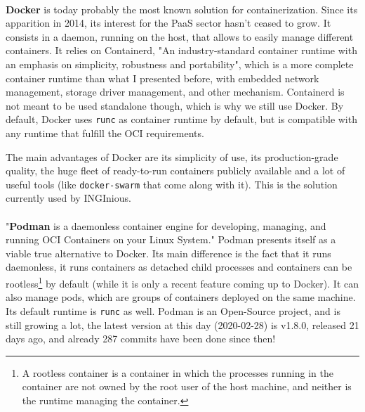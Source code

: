 \paragraph{}\textbf{Docker}\cite{merkel2014docker} is today probably the most known solution for containerization.  Since its apparition in 2014, its interest for the PaaS sector hasn't ceased to grow.  It consists in a daemon, running on the host, that allows to easily manage different containers.  It relies on Containerd, "An industry-standard container runtime with an emphasis on simplicity, robustness and portability"\cite{containerd}, which is a more complete container runtime than what I presented before, with embedded network management, storage driver management, and other mechanism.  Containerd is not meant to be used standalone though, which is why we still use Docker.  By default, Docker uses \texttt{runc} as container runtime by default, but is compatible with any runtime that fulfill the OCI\cite{oci} requirements.

The main advantages of Docker are its simplicity of use, its production-grade quality, the huge fleet of ready-to-run containers publicly available and a lot of useful tools (like \texttt{docker-swarm} that come along with it).  This is the solution currently used by INGInious.

\paragraph{}"\textbf{Podman} is a daemonless container engine for developing, managing, and running OCI\cite{oci} Containers on your Linux System."\cite{podman}  Podman presents itself as a viable true alternative to Docker.  Its main difference is the fact that it runs daemonless, it runs containers as detached child processes and containers can be rootless\footnote{A rootless container is a container in which the processes running in the container are not owned by the root user of the host machine, and neither is the runtime managing the container.} by default (while it is only a recent feature coming up to Docker).  It can also manage pods, which are groups of containers deployed on the same machine. Its default runtime is \texttt{runc} as well.  Podman is an Open-Source project, and is still growing a lot, the latest version at this day (2020-02-28) is v1.8.0, released 21 days ago, and already 287 commits have been done since then!

